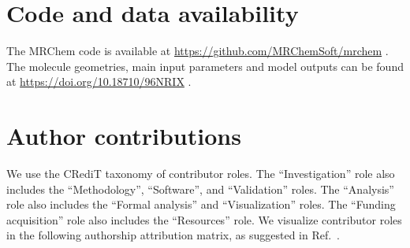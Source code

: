 \documentclass[journal=jctcce, manuscript=article]{achemso}
\begin{document}
\section{Code and data availability}
The MRChem code is available at \url{https://github.com/MRChemSoft/mrchem} \cite{mrchem}. The molecule geometries, main input parameters and model outputs can be found at \url{https://doi.org/10.18710/96NRIX} \cite{96NRIX_2022}.

\section{Author contributions}
\label{author_contrib}

We use the CRediT taxonomy of contributor roles.\cite{Allen:2014kj,Brand:2015jr}
The ``Investigation'' role also includes the ``Methodology'', ``Software'', and ``Validation'' roles.
The ``Analysis'' role also includes the ``Formal analysis'' and ``Visualization''
roles. The ``Funding acquisition'' role also includes the ``Resources'' role.
We visualize contributor roles in the following authorship attribution matrix, as suggested in Ref.~.
\end{document}
